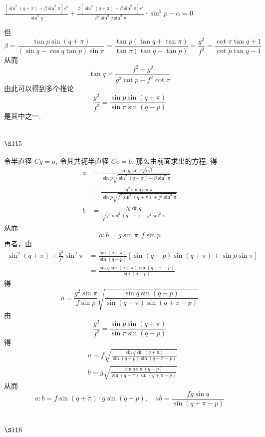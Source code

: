 $\frac{\left[\sin ^{2}(q+\pi)+\beta \sin ^{2} \pi\right] s^{2}}{\sin ^{2} q}+\frac{\beta\left[\sin ^{2}(q+\pi)+\beta \sin ^{2} \pi\right] r^{2}}{\beta^{2} \sin ^{2} q \sin ^{2} \pi} \cdot \sin ^{2} p-\alpha=0$

但
\[
\beta=\frac{\tan p \sin (q+\pi)}{(\sin q-\cos q \tan p) \sin \pi}=\frac{\tan p(\tan q+\tan \pi)}{\tan \pi(\tan q-\tan p)}=\frac{g^{2}}{f^{2}}=\frac{\cot \pi \tan q+1}{\cot p \tan q-1}
\]
从而
\[
\tan q=\frac{f^{2}+g^{2}}{g^{2} \cot p-f^{2} \cot \pi}
\]
由此可以得到多个推论
\[
\frac{g^{2}}{f^{2}}=\frac{\sin p \sin (q+\pi)}{\sin \pi \sin (q-p)}
\]
是其中之一.

\section{$\S 115$}

令半直径 $C g=a$, 令其共轭半直径 $C e=b$, 那么由前面求出的方程, 得
\[
\begin{aligned}
a & =\frac{\sin q \sin \pi \sqrt{\alpha \beta}}{\sin p \sqrt{\sin ^{2}(q+\pi)+\beta \sin ^{2} \pi}} \\
& =\frac{g^{2} \sin q \sin \pi}{\sin p \sqrt{f^{2} \sin ^{2}(q+\pi)+g^{2} \sin ^{2} \pi}} \\
b & =\frac{f g \sin q}{\sqrt{f^{2} \sin ^{2}(q+\pi)+g^{2} \sin ^{2} \pi}}
\end{aligned}
\]
从而
\[
a: b=g \sin \pi: f \sin p
\]
再者，由
\[
\begin{aligned}
\sin ^{2}(q+\pi)+\frac{g^{2}}{f^{2}} \sin ^{2} \pi & =\frac{\sin (q+\pi)}{\sin (q-p)}[\sin (q-p) \sin (q+\pi)+\sin p \sin \pi] \\
& =\frac{\sin q \sin (q+\pi) \sin (q+\pi-p)}{\sin (q-p)}
\end{aligned}
\]
得
\[
a=\frac{g^{2} \sin \pi}{f \sin p} \sqrt{\frac{\sin q \sin (q-p)}{\sin (q+\pi) \sin (q+\pi-p)}}
\]
由
\[
\frac{g^{2}}{f^{2}}=\frac{\sin p \sin (q+\pi)}{\sin \pi \sin (q-p)}
\]
得
\[
\begin{aligned}
& a=f \sqrt{\frac{\sin q \sin (q+\pi)}{\sin (q-p) \sin (q+\pi-p)}} \\
& b=g \sqrt{\frac{\sin q \sin (q-p)}{\sin (q+\pi) \sin (q+\pi-p)}}
\end{aligned}
\]
从而
\[
a: b=f \sin (q+\pi) \cdot g \sin (q-p), \quad a b=\frac{f g \sin q}{\sin (q+\pi-p)}
\]
\section{$\S 116$}

